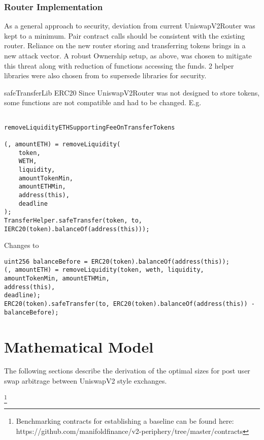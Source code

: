 \documentclass[runningheads]{llncs}
\begin{document}
\subsection{Router Implementation}
As a general approach to security, deviation from current UniswapV2Router was kept to a minimum. Pair contract calls should be consistent with the existing router. Reliance on the new router storing and transferring tokens brings in a new attack vector. A robust Ownership setup, as above, was chosen to mitigate this threat along with reduction of functions accessing the funds. 2 helper libraries were also chosen from  to supersede  libraries for security.

safeTransferLib
ERC20
Since UniswapV2Router was not designed to store tokens, some functions are not compatible and had to be changed. E.g.

\begin{verbatim}

removeLiquidityETHSupportingFeeOnTransferTokens

(, amountETH) = removeLiquidity(
    token,
    WETH,
    liquidity,
    amountTokenMin,
    amountETHMin,
    address(this),
    deadline
);
TransferHelper.safeTransfer(token, to, IERC20(token).balanceOf(address(this)));
\end{verbatim}
Changes to

\begin{verbatim}
uint256 balanceBefore = ERC20(token).balanceOf(address(this));
(, amountETH) = removeLiquidity(token, weth, liquidity, amountTokenMin, amountETHMin, 
address(this), 
deadline);
ERC20(token).safeTransfer(to, ERC20(token).balanceOf(address(this)) - balanceBefore);
\end{verbatim}

\newpage

\chapter{Mathematical Model}




The following sections describe the derivation of the optimal sizes for post user swap arbitrage between UniswapV2 style exchanges.

\footnote{Benchmarking contracts for establishing a baseline can be found here: https://github.com/manifoldfinance/v2-periphery/tree/master/contracts }
\end{document}
